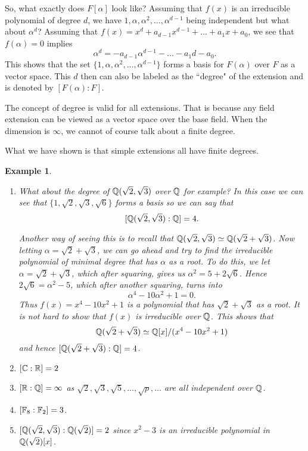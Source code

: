 \documentclass[12pt]{article}
\theoremstyle{plain}
\newtheorem{example}{Example}
\theoremstyle{definition}
\theoremstyle{remark}
\begin{document}
So, what exactly does $F[\alpha]$ look like?
Assuming that $f(x)$ is an irreducible polynomial of degree $d$, we have $1, \alpha, \alpha^2, \dots, \alpha^{d-1}$ being independent but what about $\alpha^d$? Assuming that $f(x)=x^d+a_{d-1}x^{d-1}+\dots +a_1x+a_0$, we see that $f(\alpha)=0$ implies 
$$\alpha^d=-a_{d-1}\alpha^{d-1}-\dots -a_1d-a_0.$$
This shows that the set $\{1, \alpha, \alpha^2, \dots, \alpha^{d-1}\}$ forms a basis for $F(\alpha)$ over $F$
as a vector space. This $d$ then can also be labeled as the ``degree" of the extension and is denoted by $[F(\alpha):F]$. 

The concept of degree is valid for all extensions. That is because any field extension can be viewed as a vector space over the base field. When the dimension is $\infty$, we cannot of course talk about a finite degree. 

What we have shown is that simple extensions all have finite degrees. 

\begin{example}
\begin{enumerate}
 \item What about the degree of $\mathbb{Q}(\sqrt{2}, \sqrt{3})$ over $\mathbb{Q}$ for example? In this case we can see that $\{1, \sqrt{2}, \sqrt{3}, \sqrt{6}\}$ forms a basis so we can say that 
 $$[\mathbb{Q}(\sqrt{2}, \sqrt{3}):\mathbb{Q}]=4.$$
 
 Another way of seeing this is to recall that $\mathbb{Q}(\sqrt{2}, \sqrt{3}) \simeq \mathbb{Q}(\sqrt{2}+\sqrt{3})$. Now letting $\alpha=\sqrt{2}+\sqrt{3}$, we can go ahead and try to find the irreducible polynomial of minimal degree that has $\alpha$ as a root. To do this, we let 
 $\alpha=\sqrt{2}+\sqrt{3}$, which after squaring, gives us 
 $\alpha^2=5+2\sqrt{6}$. Hence $2\sqrt{6}=\alpha^2-5$, which after another squaring, turns into 
 $$\alpha^4-10\alpha^2+1=0.$$
 Thus $f(x)=x^4-10x^2+1$ is a polynomial that has $\sqrt{2}+\sqrt{3}$ as a root. It is not hard to show that $f(x)$ is irreducible over $\mathbb{Q}$. This shows that 
 $$\mathbb{Q}(\sqrt{2}+\sqrt{3}) \simeq \mathbb{Q}[x]/(x^4-10x^2+1)$$ and hence
 $[\mathbb{Q}(\sqrt{2}+\sqrt{3}):\mathbb{Q}]=4$. 
\item $[\mathbb{C}:\mathbb{R}]=2$
\item $[\mathbb{R}:\mathbb{Q}]=\infty$ as $\sqrt{2}, \sqrt{3}, \sqrt{5}, \dots, \sqrt{p}, \dots$ are all independent over $\mathbb{Q}$.  
\item $[\mathbb{F}_8:\mathbb{F}_2]=3$.
\item $[\mathbb{Q}(\sqrt{2}, \sqrt{3}):\mathbb{Q}(\sqrt{2})]=2$ since $x^2-3$ is an irreducible polynomial in $\mathbb{Q}(\sqrt{2})[x]$. 
\end{enumerate}
 \end{example}
 
\end{document}
